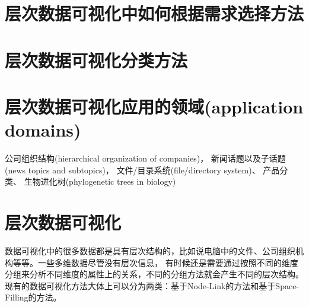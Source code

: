 \documentclass{article}
\begin{document}
\normalem
\section{层次数据可视化中如何根据需求选择方法}

\section{层次数据可视化分类方法}

\section{层次数据可视化应用的领域(application domains)}
公司组织结构(hierarchical organization of companies)，
新闻话题以及子话题(news topics and subtopics)，
文件/目录系统(file/directory system)、
产品分类、
生物进化树(phylogenetic trees in biology)


\section{层次数据可视化}
数据可视化中的很多数据都是具有层次结构的，比如说电脑中的文件、公司组织机构等等。一些多维数据尽管没有层次信息，
有时候还是需要通过按照不同的维度分组来分析不同维度的属性上的关系，不同的分组方法就会产生不同的层次结构。
现有的数据可视化方法大体上可以分为两类：基于Node-Link的方法和基于Space-Filling的方法。
\end{document}
